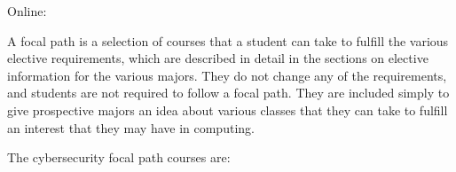 \noindent Online: \csugradURL




A focal path is a selection of courses that a student can take to
fulfill the various elective requirements, which are described in
detail in the sections on elective information for the various
majors. They do not change any of the requirements, and students are
not required to follow a focal path. They are included simply to give
prospective majors an idea about various classes that they can take to
fulfill an interest that they may have in computing. %


The cybersecurity focal path courses are:




\iffalse
\begin{itemlist}
\item APMA/STAT elective: Statistics (APMA 3120 or STAT 3120)
\item Theory courses: Theory of Computation (CS 3102), Algorithms (CS
  4102).  Note that one or both may be required, depending on the
  computing major.
\item CS upper level courses: Operating Systems (CS 4414), Computer
  Networks (CS 4457), Defense Against the Dark Arts (CS 4630),
  Database Systems (CS 4750), Network Security (CS 4760) CS 4414:
  Operating Systems.  Some of these are required courses for the
  different computing majors.
\end{itemlist}
\fi

